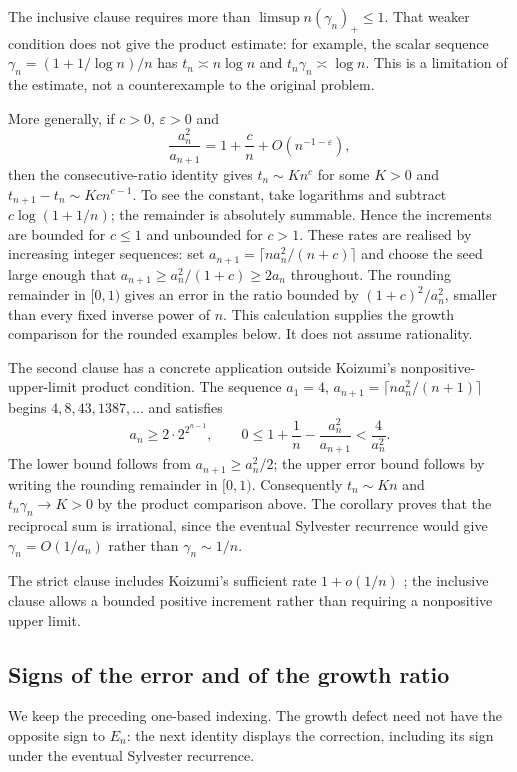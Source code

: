 \documentclass[11pt]{article}
\begin{document}
The inclusive clause requires more than $\limsup n(\gamma_n)_+\le1$.
That weaker condition does not give the product estimate: for example,
the scalar sequence $\gamma_n=(1+1/\log n)/n$ has $t_n\asymp n\log n$
and $t_n\gamma_n\asymp\log n$. This is a limitation of the estimate, not a
counterexample to the original problem.

More generally, if $c>0$, $\varepsilon>0$ and
\[
 \frac{a_n^2}{a_{n+1}}=1+\frac cn+O(n^{-1-\varepsilon}),
\]
then the consecutive-ratio identity gives $t_n\sim Kn^c$ for some
$K>0$ and $t_{n+1}-t_n\sim Kc n^{c-1}$. To see the constant, take
logarithms and subtract $c\log(1+1/n)$; the remainder is absolutely summable.
Hence the increments are bounded for $c\le1$ and unbounded for $c>1$.
These rates are realised by increasing integer sequences: set
$a_{n+1}=\lceil n a_n^2/(n+c)\rceil$ and choose the seed large enough
that $a_{n+1}\ge a_n^2/(1+c)\ge2a_n$ throughout. The rounding remainder
in $[0,1)$ gives an error in the ratio bounded by
$(1+c)^2/a_n^2$, smaller than every fixed inverse power of $n$.
This calculation supplies the growth comparison for the rounded
examples below. It does not assume rationality.

The second clause has a concrete application outside Koizumi's
nonpositive-upper-limit product condition. The sequence
$a_1=4$, $a_{n+1}=\lceil n a_n^2/(n+1)\rceil$ begins
$4,8,43,1387,\ldots$ and satisfies
\[
 a_n\ge2\cdot2^{2^{n-1}},\qquad
 0\le1+\frac1n-\frac{a_n^2}{a_{n+1}}<\frac4{a_n^2}.
\]
The lower bound follows from $a_{n+1}\ge a_n^2/2$; the upper error bound
follows by writing the rounding remainder in $[0,1)$.
Consequently $t_n\sim Kn$ and $t_n\gamma_n\to K>0$ by the product
comparison above. The corollary proves that the reciprocal sum is
irrational, since the eventual Sylvester recurrence would give
$\gamma_n=O(1/a_n)$ rather than $\gamma_n\sim1/n$.

The strict clause includes Koizumi's sufficient
rate $1+o(1/n)$ \cite[Remark~3, p.~16]{koizumi2025}; the inclusive clause
allows a bounded positive increment rather than requiring a nonpositive
upper limit.

\subsection{Signs of the error and of the growth ratio}

We keep the preceding one-based indexing. The growth defect need not
have the opposite sign to $E_n$: the next identity displays the
correction, including its sign under the eventual Sylvester recurrence.
\end{document}
